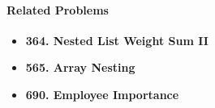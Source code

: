 \paragraph{Related Problems}
\begin{itemize}
\item \textbf{364. Nested List Weight Sum II}
\item \textbf{565. Array Nesting}
\item \textbf{690. Employee Importance}
\end{itemize}
